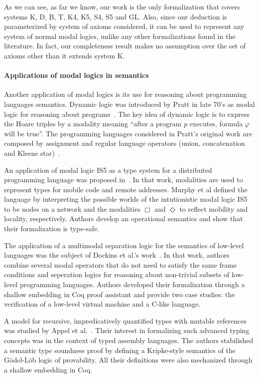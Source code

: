 \documentclass[3p,times]{elsarticle}
\begin{document}
As we can see, as far we know, our work is the only formalization that covers systems
K, D, B, T, K4, K5, S4, S5 and GL. Also, since our deduction is
parameterized by system of axioms considered, it can be used to represent any
system of normal modal logics, unlike any other formalizations found in the literature.
In fact, our completeness result makes no assumption over the set of axioms other than it extends system K.

\paragraph{Applications of modal logics in semantics} Another application of
modal logics is its use for reasoning about programming languages semantics.
Dynamic logic was introduced by Pratt in late 70's as modal logic for reasoning
about programs~\cite{Pratt76,Pratt80}. The key idea of dynamic logic is to express the
Hoare triples by a modality meaning ``after a program $p$ executes, formula
$\varphi$ will be true''. The programming languages considered in Pratt's
original work are composed by assignment and regular language operators
(union, concatenation and Kleene star)~\cite{Pratt76}.

An application of modal logic IS5 as a type system for a distributed
programming language was proposed in~\cite{Murphy04}.
In that work, modalities are used to represent types for mobile code
and remote addresses. Murphy et al defined the language by interpreting
the possible worlds of the intutionistic modal logic IS5 to be nodes on a
network and the modalities $\Box$ and $\Diamond$ to reflect mobility and
locality, respectively. Authors develop an operational semantics and show
that their formalization is type-safe.

The application of a multimodal separation logic for the semantics of low-level languages
was the subject of Dockins et al.'s work~\cite{Dockins08}. In that work, authors
combine several modal operators that do not need to satisfy the same frame
conditions and seperation logics for reasoning about non-trivial subsets of
low-level programming languages. Authors developed their formalization through a
shallow embedding in Coq proof assistant and provide two case studies:
the verification of a low-level virtual machine and a C-like language.

A model for recursive, impredicatively quantified types with mutable references
was studied by Appel et al.~\cite{Appel07}. Their interest in formalizing such
advanced typing concepts was in the context of typed assembly languages.
The authors stabilished a semantic type soundness proof by defining a Kripke-style
semantics of the G\"odel-L\"ob logic of provability. All their definitions were
also mechanized through a shallow embedding in Coq.
\end{document}
